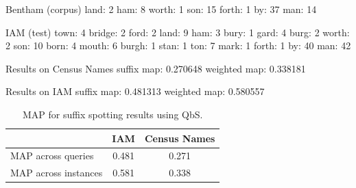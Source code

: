 \documentclass[ms,electronic,twosidetoc,letterpaper,chaptercenter,parttop,lol,lof,lot]{byumsphd}
\begin{document}
Bentham (corpus)
land: 2
ham: 8
worth: 1
son: 15
forth: 1
by: 37
man: 14

IAM (test)
town: 4
bridge: 2
ford: 2
land: 9
ham: 3
bury: 1
gard: 4
burg: 2
worth: 2
son: 10
born: 4
mouth: 6
burgh: 1
stan: 1
ton: 7
mark: 1
forth: 1
by: 40
man: 42

Results on Census Names
  suffix map: 0.270648
weighted map: 0.338181

Results on IAM
  suffix map: 0.481313 
weighted map: 0.580557


\begin{table}
\centering
\begin{tabular}{| l | c  c |}
  \hline
   & IAM & Census Names\\
  \hline			
  MAP across queries & 0.481  & 0.271\\
  MAP across instances & 0.581 & 0.338\\ 
  \hline  
\end{tabular}
\caption{MAP for suffix spotting results using QbS.}
\label{tab:suffixspottingresults}
\end{table}
\end{document}
